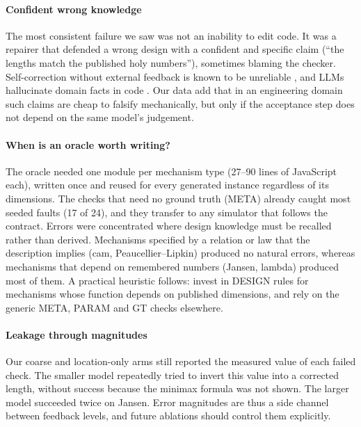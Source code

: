 \paragraph{Confident wrong knowledge} The most consistent failure we saw was not an inability to edit code. It was a repairer that defended a wrong design with a confident and specific claim (``the lengths match the published holy numbers''), sometimes blaming the checker. Self-correction without external feedback is known to be unreliable \cite{huang2024cannot,kamoi2024selfcorrection}, and LLMs hallucinate domain facts in code \cite{liu2026codehallucination,tian2025codehalu}. Our data add that in an engineering domain such claims are cheap to falsify mechanically, but only if the acceptance step does not depend on the same model's judgement.

\paragraph{When is an oracle worth writing?} The oracle needed one module per mechanism type (27--90 lines of JavaScript each), written once and reused for every generated instance regardless of its dimensions. The checks that need no ground truth (META) already caught most seeded faults (17 of 24), and they transfer to any simulator that follows the contract. Errors were concentrated where design knowledge must be recalled rather than derived. Mechanisms specified by a relation or law that the description implies (cam, Peaucellier--Lipkin) produced no natural errors, whereas mechanisms that depend on remembered numbers (Jansen, lambda) produced most of them. A practical heuristic follows: invest in DESIGN rules for mechanisms whose function depends on published dimensions, and rely on the generic META, PARAM and GT checks elsewhere.

\paragraph{Leakage through magnitudes} Our coarse and location-only arms still reported the measured value of each failed check. The smaller model repeatedly tried to invert this value into a corrected length, without success because the minimax formula was not shown. The larger model succeeded twice on Jansen. Error magnitudes are thus a side channel between feedback levels, and future ablations should control them explicitly.
